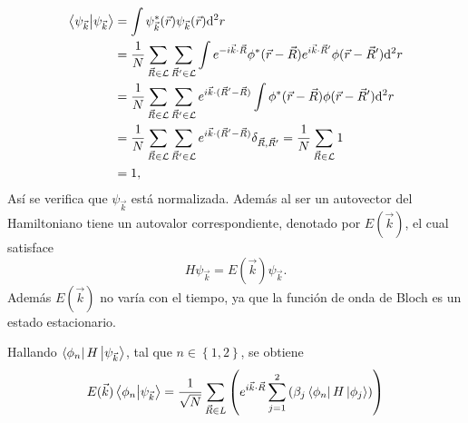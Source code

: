 \begin{align*}
	\braket{\psi_{\vec{k}}}{\psi_{\vec{k}}} & = \int \psi_{\vec{k}}^{\ast}(\vec{r}) \psi_{\vec{k}}(\vec{r})  \dd^2 r                                                                                                                                                                                                             \\
	                                       & = \frac{1}{N}\sum_{\vec{R}\in \mathcal{L}}\sum_{\vec{R}'\in \mathcal{L}}\int e^{-i \vec{k}\cdot \vec{R}}\phi^{\ast}(\vec{r} - \vec{R}) e^{i \vec{k}\cdot \vec{R}'}\phi( \vec{r} - \vec{R}') \dd^2 r                                                                                \\
	                                       & = \frac{1}{N}\sum_{\vec{R}\in \mathcal{L}}\sum_{\vec{R}'\in \mathcal{L}}e^{i \vec{k}\cdot (\vec{R}'-\vec{R})}\int \phi^{\ast}(\vec{r} - \vec{R}) \phi(\vec{r} - \vec{R}') \dd^2 r                                                                                                  \\
	                                       & = \frac{1}{N}\sum_{\vec{R}\in \mathcal{L}}\sum_{\vec{R}'\in \mathcal{L}}e^{i \vec{k}\cdot (\vec{R}'-\vec{R})}\delta_{\vec{R}, \vec{R}'} = \frac{1}{N}\sum_{\vec{R}\in \mathcal{L}}1                                                                                                                                                                                                                                            \\
	                                        & = 1,
\end{align*}
Así se verifica que $\psi_{\vec{k}}$ está normalizada. Además al ser un autovector del Hamiltoniano tiene un autovalor correspondiente, denotado por $E(\vec{k})$, el cual satisface
\begin{equation}
	H\psi_{\vec{k}} = E(\vec{k})\psi_{\vec{k}}.
\end{equation}
Además $E(\vec{k})$ no varía con el tiempo, ya que la función de onda de Bloch es un estado estacionario.\par
Hallando $\bra{\phi_n}H\ket{\psi_{\vec{k}}}$, tal que $n \in\left\{1,2\right\}$, se obtiene
\begin{equation}
	E(\vec{k}) \braket{\phi_n}{\psi_{\vec{k}}} = \frac{1}{\sqrt{N}}\sum_{\vec{R}\in L}\left(e^{i \vec{k}\cdot \vec{R}}\sum_{j=1}^{2}\left(\beta_j\bra{\phi_n}H\ket{\phi_j}\right)\right)
\end{equation}
